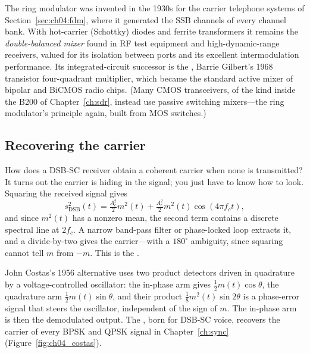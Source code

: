 The ring modulator was invented in the 1930s for the carrier telephone systems of
Section~\ref{sec:ch04:fdm}, where it generated the SSB channels of every channel bank. With hot-carrier
(Schottky) diodes and ferrite transformers it remains the \emph{double-balanced mixer} found in RF test
equipment and high-dynamic-range receivers, valued for its isolation between ports and its excellent
intermodulation performance. Its integrated-circuit successor is the , Barrie
Gilbert's 1968 transistor four-quadrant multiplier, which became the standard active mixer of bipolar
and BiCMOS radio chips. (Many CMOS transceivers, of the kind inside the B200 of Chapter~\ref{ch:sdr},
instead use passive switching mixers---the ring modulator's principle again, built from MOS switches.)

\subsection{Recovering the carrier}
\label{sec:ch04:carrierrec}

How does a DSB-SC receiver obtain a coherent carrier when none is transmitted? It turns out the carrier
is hiding in the signal; you just have to know how to look. Squaring the received signal gives
\begin{equation}
s_{\text{DSB}}^2(t)=\tfrac{A_c^2}{2}m^2(t)+\tfrac{A_c^2}{2}m^2(t)\cos(4\pi f_ct),
\end{equation}
and since $m^2(t)$ has a nonzero mean, the second term contains a discrete spectral line at $2f_c$. A
narrow band-pass filter or phase-locked loop extracts it, and a divide-by-two gives the carrier---with a
$180^\circ$ ambiguity, since squaring cannot tell $m$ from $-m$. This is the .

John Costas's 1956 alternative uses two product detectors driven in quadrature by a voltage-controlled
oscillator: the in-phase arm gives $\frac12m(t)\cos\theta$, the quadrature arm $\frac12m(t)\sin\theta$,
and their product $\frac18m^2(t)\sin2\theta$ is a phase-error signal that steers the oscillator,
independent of the sign of $m$. The in-phase arm is then the demodulated output. The ,
born for DSB-SC voice, recovers the carrier of every BPSK and QPSK signal in Chapter~\ref{ch:sync}
(Figure~\ref{fig:ch04_costas}).

